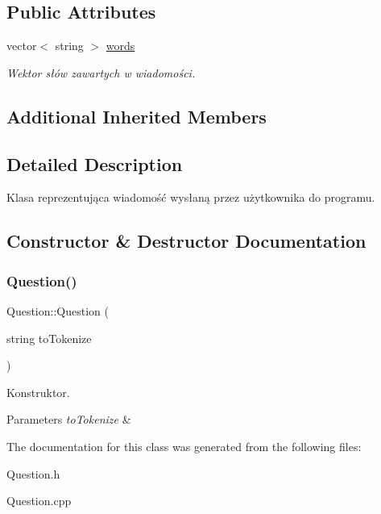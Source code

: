\subsection*{Public Attributes}
\begin{DoxyCompactItemize}
\item 
\mbox{\label{class_question_a2cbc07f6d10d31c6a6213b778ed0a4fd}} 
vector$<$ string $>$ \mbox{\hyperlink{class_question_a2cbc07f6d10d31c6a6213b778ed0a4fd}{words}}
\begin{DoxyCompactList}\small\item\em Wektor słów zawartych w wiadomości. \end{DoxyCompactList}\end{DoxyCompactItemize}
\subsection*{Additional Inherited Members}


\subsection{Detailed Description}
Klasa reprezentująca wiadomość wysłaną przez użytkownika do programu. 

\subsection{Constructor \& Destructor Documentation}
\mbox{\label{class_question_a78715ae00f2c53067f45c51fbd6febf5}} 
\subsubsection{\texorpdfstring{Question()}{Question()}}
{\footnotesize\ttfamily Question\+::\+Question (\begin{DoxyParamCaption}\item[{string}]{to\+Tokenize }\end{DoxyParamCaption})}



Konstruktor. 


\begin{DoxyParams}{Parameters}
{\em to\+Tokenize} & \\
\hline
\end{DoxyParams}


The documentation for this class was generated from the following files\+:\begin{DoxyCompactItemize}
\item 
Question.\+h\item 
Question.\+cpp\end{DoxyCompactItemize}
